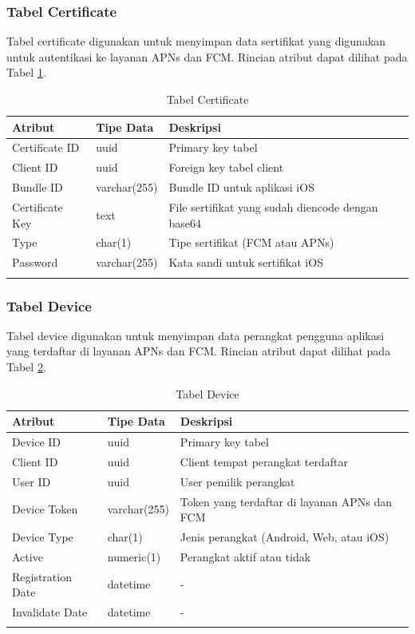 \subsubsection{Tabel Certificate}
\par Tabel certificate digunakan untuk menyimpan data sertifikat yang digunakan untuk autentikasi ke layanan APNs dan FCM. Rincian atribut dapat dilihat pada Tabel \ref{tabel_certificate}.
\begin{longtable}{|p{2cm}|p{2.5cm}|p{4.5cm}|}
    \hline
    \textbf{Atribut} & \textbf{Tipe Data} & \textbf{Deskripsi} \\ \hline
    Certificate ID & uuid & Primary key tabel \\ \hline
    Client ID & uuid & Foreign key tabel client \\ \hline
    Bundle ID & varchar(255) & Bundle ID untuk aplikasi iOS \\ \hline
    Certificate Key & text & File sertifikat yang sudah diencode dengan base64 \\ \hline
    Type & char(1) & Tipe sertifikat (FCM atau APNs) \\ \hline
    Password & varchar(255) & Kata sandi untuk sertifikat iOS \\ \hline
    \caption{Tabel Certificate}
    \label{tabel_certificate}
\end{longtable}

\subsubsection{Tabel Device}
\par Tabel device digunakan untuk menyimpan data perangkat pengguna aplikasi yang terdaftar di layanan APNs dan FCM. Rincian atribut dapat dilihat pada Tabel \ref{tabel_device}.
\begin{longtable}{|p{2cm}|p{2.5cm}|p{4.5cm}|}
    \hline
    \textbf{Atribut} & \textbf{Tipe Data} & \textbf{Deskripsi} \\ \hline
    Device ID & uuid & Primary key tabel \\ \hline
    Client ID & uuid & Client tempat perangkat terdaftar \\ \hline
    User ID & uuid & User pemilik perangkat \\ \hline
    Device Token & varchar(255) & Token yang terdaftar di layanan APNs dan FCM \\ \hline
    Device Type & char(1) & Jenis perangkat (Android, Web, atau iOS) \\ \hline
    Active & numeric(1) & Perangkat aktif atau tidak \\ \hline
    Registration Date & datetime & - \\ \hline
    Invalidate Date & datetime & - \\ \hline
    \caption{Tabel Device}
    \label{tabel_device}
\end{longtable}

